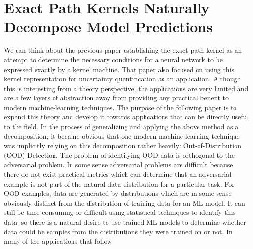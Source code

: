 \chapter{Exact Path Kernels Naturally Decompose Model Predictions}
\label{Chapter4a}

We can think about the previous paper establishing the exact path
kernel as an attempt to determine the necessary conditions for a
neural network to be expressed exactly by a kernel machine. That paper
also focused on using this kernel representation for uncertainty
quantification as an application. Although this is interesting from a
theory perspective, the applications are very limited and are a few
layers of abstraction away from providing any practical benefit to
modern machine-learning techniques. The purpose of the following paper
is to expand this theory and develop it towards applications that can
be directly useful to the field. In the process of generalizing and
applying the above method as a decomposition, it became obvious that
one modern machine-learning technique was implicitly relying on this
decomposition rather heavily: Out-of-Distribution (OOD)
Detection. The problem of identifying OOD data is orthogonal to the
adversarial problem. In some sense adversarial problems are difficult
because there do not exist practical metrics which can determine that
an adversarial example is not part of the natural data distribution
for a particular task. For OOD examples, data are generated by
distributions which are in some sense obviously distinct from the distribution
of training data for an ML model. It can still be time-consuming or
difficult using statistical techniques to identify this data, so there
is a natural desire to use trained ML models to determine whether data
could be samples from the distributions they were trained on or
not. In many of the applications that follow

